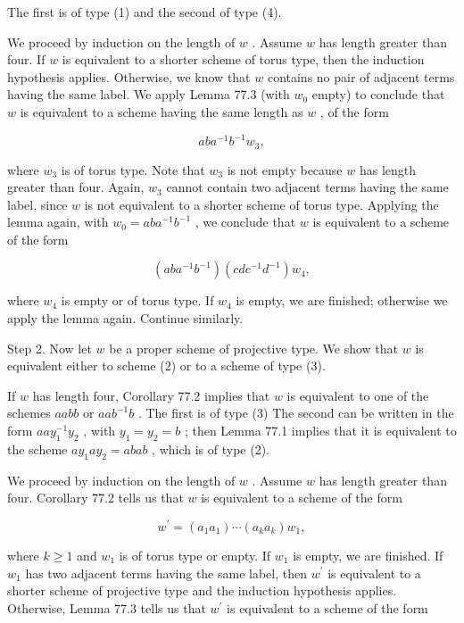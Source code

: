 The first is of type (1) and the second of type (4).

We proceed by induction on the length of \(w\) . Assume \(w\) has length greater than four. If \(w\) is equivalent to a shorter scheme of torus type, then the induction hypothesis applies. Otherwise, we know that \(w\) contains no pair of adjacent terms having the same label. We apply Lemma 77.3 (with \({w}_{0}\) empty) to conclude that \(w\) is equivalent to a scheme having the same length as \(w\) , of the form

\[
{ab}{a}^{-1}{b}^{-1}{w}_{3},
\]

where \({w}_{3}\) is of torus type. Note that \({w}_{3}\) is not empty because \(w\) has length greater than four. Again, \({w}_{3}\) cannot contain two adjacent terms having the same label, since \(w\) is not equivalent to a shorter scheme of torus type. Applying the lemma again, with \({w}_{0} = {ab}{a}^{-1}{b}^{-1}\) , we conclude that \(w\) is equivalent to a scheme of the form

\[
\left( {{ab}{a}^{-1}{b}^{-1}}\right) \left( {{cd}{c}^{-1}{d}^{-1}}\right) {w}_{4},
\]

where \({w}_{4}\) is empty or of torus type. If \({w}_{4}\) is empty, we are finished; otherwise we apply the lemma again. Continue similarly.

Step 2. Now let \(w\) be a proper scheme of projective type. We show that \(w\) is equivalent either to scheme (2) or to a scheme of type (3).

If \(w\) has length four, Corollary 77.2 implies that \(w\) is equivalent to one of the schemes \({aabb}\) or \({aa}{b}^{-1}b\) . The first is of type (3) The second can be written in the form \({aa}{y}_{1}^{-1}{y}_{2}\) , with \({y}_{1} = {y}_{2} = b\) ; then Lemma 77.1 implies that it is equivalent to the scheme \(a{y}_{1}a{y}_{2} = {abab}\) , which is of type (2).

We proceed by induction on the length of \(w\) . Assume \(w\) has length greater than four. Corollary 77.2 tells us that \(w\) is equivalent to a scheme of the form

\[
{w}^{\prime } = \left( {{a}_{1}{a}_{1}}\right) \cdots \left( {{a}_{k}{a}_{k}}\right) {w}_{1},
\]

where \(k \geq  1\) and \({w}_{1}\) is of torus type or empty. If \({w}_{1}\) is empty, we are finished. If \({w}_{1}\) has two adjacent terms having the same label, then \({w}^{\prime }\) is equivalent to a shorter scheme of projective type and the induction hypothesis applies. Otherwise, Lemma 77.3 tells us that \({w}^{\prime }\) is equivalent to a scheme of the form

